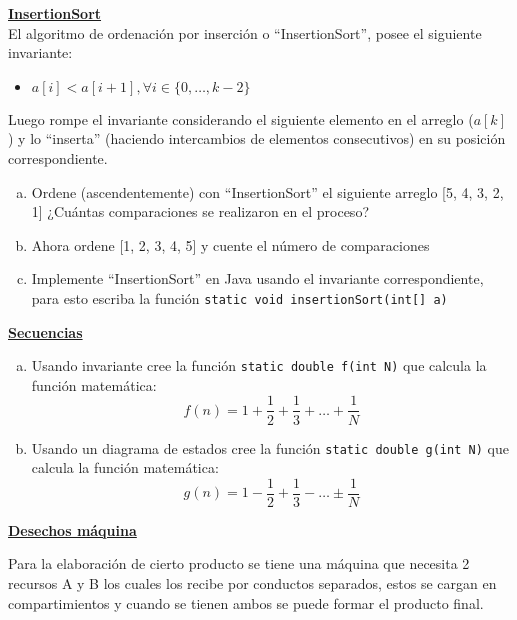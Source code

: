 \documentclass[dcc,uchile,sol]{fcfmcourse}
\begin{document}
\begin{problems}
\problem \underline{\textbf{InsertionSort}}\\
El algoritmo de ordenación por inserción o ``InsertionSort'', posee el siguiente invariante:
\begin{itemize}
    \item $a[i] < a[i+1], \forall i \in \{0,\ldots, k-2\}$
\end{itemize}
Luego rompe el invariante considerando el siguiente elemento en el arreglo ($a[k]$) y lo ``inserta'' (haciendo intercambios de elementos consecutivos) en su posición correspondiente.
\begin{enumerate}[a)]
    \item Ordene (ascendentemente) con ``InsertionSort'' el siguiente arreglo [5, 4, 3, 2, 1] ¿Cuántas comparaciones se realizaron en el proceso?
    \item Ahora ordene [1, 2, 3, 4, 5] y cuente el número de comparaciones
    \item Implemente ``InsertionSort'' en Java usando el invariante correspondiente, para esto escriba la función \texttt{static void insertionSort(int[] a)}
\end{enumerate}
\newpage
\problem \underline{\textbf{Secuencias}}
\begin{enumerate}[a)]
    \item Usando invariante cree la función \texttt{static double f(int N)} que calcula la función matemática:
    \begin{equation*}
        f(n) = 1 + \frac{1}{2} + \frac{1}{3} + \ldots + \frac{1}{N}
    \end{equation*}
    \item Usando un diagrama de estados cree la función \texttt{static double g(int N)} que calcula la función matemática:
    \begin{equation*}
        g(n) = 1 - \frac{1}{2} + \frac{1}{3} - \ldots \pm \frac{1}{N}
    \end{equation*}
\end{enumerate}

\problem \underline{\textbf{Desechos máquina}}

Para la elaboración de cierto producto se tiene una máquina que necesita 2 recursos A y B los cuales los recibe por conductos separados, estos se cargan en compartimientos y cuando se tienen ambos se puede formar el producto final.


\end{problems}
\end{document}
